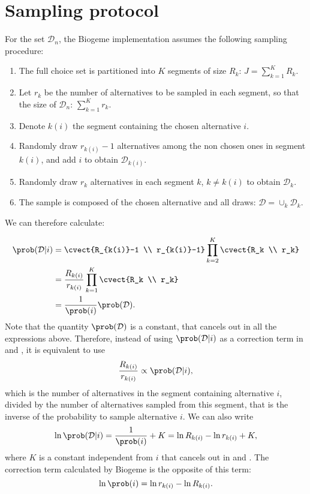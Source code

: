 \documentclass[12pt,a4paper]{article}
\begin{document}
\section{Sampling protocol}
\label{sec:protocol}

For the set $\mathcal{D}_n$, the Biogeme implementation assumes the following sampling procedure:

\begin{enumerate}
  \item The full  choice set is partitioned into $K$ segments of size $R_k$: $J=\sum_{k=1}^K R_k$.
  \item Let $r_k$ be the number of alternatives to be sampled in each segment, so that the size of $\mathcal{D}_n$: $\sum_{k=1}^K r_k$.
  \item Denote $k(i)$ the segment containing the chosen alternative $i$.
  \item Randomly draw $r_{k(i)}-1$ alternatives among the non chosen ones in segment $k(i)$, and add $i$ to obtain $\mathcal{D}_{k(i)}$.
  \item Randomly draw $r_k$ alternatives in each segment $k$, $k\neq k(i)$ to obtain $\mathcal{D}_k$.
  \item The sample is composed of the chosen alternative and all draws: $\mathcal{D} = \cup_k \mathcal{D}_k$.
\end{enumerate}

We can therefore calculate:

\begin{align*}
      \prob(\mathcal{D} | i) &= \cvect{R_{k(i)}-1 \\ r_{k(i)}-1} \prod_{k=2}^K \cvect{R_k \\ r_k} \\
      &= \frac{R_{k(i)}}{r_{k(i)}} \prod_{k=1}^K \cvect{R_k \\ r_k} \\
        &= \frac{1}{\prob(i)} \prob(\mathcal{D}).
\end{align*}
Note that the quantity $\prob(\mathcal{D})$ is a constant, that cancels out in all the expressions above. Therefore, instead of using $\prob(\mathcal{D} | i)$ as a correction term in  and , it is equivalent to use
\begin{equation}
\frac{R_{k(i)}}{r_{k(i)}}  \propto \prob(\mathcal{D} | i),
\end{equation}
which is the number of alternatives in the segment containing alternative $i$, divided by the number of alternatives sampled from this segment, that is the inverse of the probability to sample alternative $i$. We can also write
\begin{equation}
\ln \prob(\mathcal{D} | i) = \frac{1}{\prob(i)} + K = \ln R_{k(i)} - \ln r_{k(i)} + K,
\end{equation}
where $K$ is a constant independent from $i$ that cancels out  in  and .
The correction term calculated by Biogeme is the opposite of this term:
\begin{equation}
  \label{eq:alt_sampling_proba}
\ln \prob(i) = \ln r_{k(i)} - \ln R_{k(i)}.
\end{equation}
\end{document}
